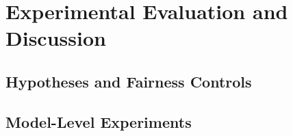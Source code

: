 \chapter{Experimental Evaluation and Discussion}
\label{chap:evaluation}

\section{Hypotheses and Fairness Controls}
\label{sec:eval:hypotheses}

\section{Model-Level Experiments}
\label{sec:eval:model-level}

